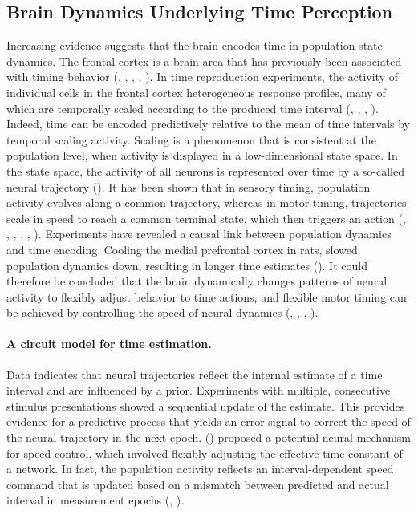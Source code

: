 \documentclass[10pt, a4paper]{article}
\begin{document}
\subsection{Brain Dynamics Underlying Time Perception}
Increasing evidence suggests that the brain encodes time in population state dynamics. 
The frontal cortex is a brain area that has previously been associated with timing behavior (\cite{Shima2000}, \cite{Lewis2004}, \cite{Genovesio2006}, \cite{Emmons2017}, \cite{Wang2018}).
In time reproduction experiments, the activity of individual cells in the frontal cortex heterogeneous response profiles, many of which are temporally scaled according to the produced time interval (\cite{Remington2018}, \cite{Wang2018}, \cite{Sohn2019}, \cite{Henke2021}).
Indeed, time can be encoded predictively relative to the mean of time intervals by temporal scaling activity.
Scaling is a phenomenon that is consistent at the population level, when activity is displayed in a low-dimensional state space. In the state space, the activity of all neurons is represented over time by a so-called neural trajectory (\cite{Cueva2022}).
It has been shown that in sensory timing, population activity evolves along a common trajectory, whereas in motor timing, trajectories scale in speed to reach a common terminal state, which then triggers an action (\cite{Mita2009}, \cite{Murakami2014}, \cite{Wang2018}, \cite{Sohn2019}, \cite{Henke2021}, \cite{Meirhaeghe2021}).
Experiments have revealed a causal link between population dynamics and time encoding. Cooling the medial prefrontal cortex in rats, slowed population dynamics down, resulting in longer time estimates (\cite{Xu2014}). 
It could therefore be concluded that the brain dynamically changes patterns of neural activity to flexibly adjust behavior to time actions, and flexible motor timing can be achieved by controlling the speed of neural dynamics (\cite{Remington2018}, \cite{Wang2018}, \cite{Sohn2019}, \cite{Tsao2022}).

\paragraph{A circuit model for time estimation.}
Data indicates that neural trajectories reflect the internal estimate of a time interval and are influenced by a prior.
Experiments with multiple, consecutive stimulus presentations showed a sequential update of the estimate. This provides evidence for a predictive process that yields an error signal to correct the speed of the neural trajectory in the next epoch.
\citeauthor{Wang2018} (\citeyear{Wang2018}) proposed a potential neural mechanism for speed control, which involved flexibly adjusting the effective time constant of a network.
In fact, the population activity reflects an interval-dependent speed command that is updated based on a mismatch between predicted and actual interval in measurement epochs (\cite{Wang2018}, \cite{Egger2019}). 
\end{document}
